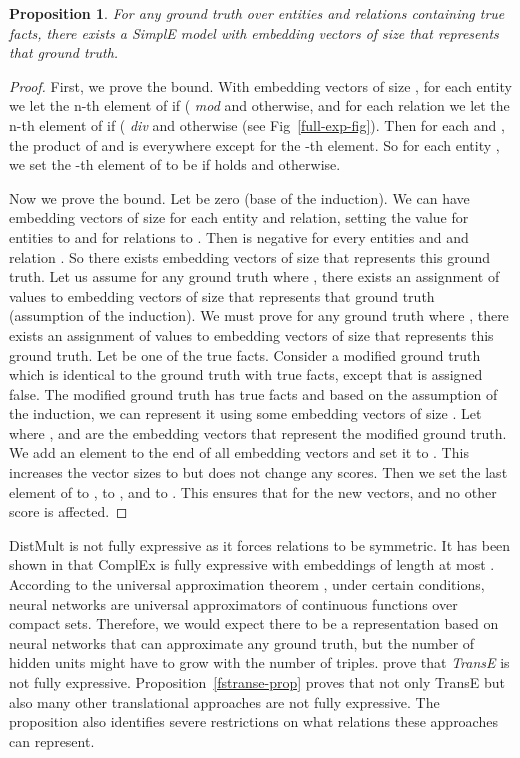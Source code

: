 \documentclass{article}
\newtheorem{proposition}{Proposition}
\begin{document}
\begin{proposition} \label{fully-expressiveness-prop}
For any ground truth over entities  and relations  containing  true facts, there exists a SimplE model with embedding vectors of size  that represents that ground truth.
\end{proposition}

\begin{proof}
First, we prove the  bound. With embedding vectors of size , for each entity  we let the n-th element of  if ( \emph{mod}  and  otherwise, and for each relation  we let the n-th element of  if ( \emph{div}  and  otherwise (see Fig~\ref{full-exp-fig}). Then for each  and , the product of  and  is  everywhere except for the -th element. So for each entity , we set the -th element of  to be  if  holds and  otherwise.

Now we prove the  bound. Let  be zero (base of the induction). We can have embedding vectors of size  for each entity and relation, setting the value for entities to  and for relations to . Then  is negative for every entities  and  and relation . So there exists embedding vectors of size  that represents this ground truth.
Let us assume for any ground truth where  , there exists an assignment of values to embedding vectors of size  that represents that ground truth (assumption of the induction). We must prove for any ground truth where , there exists an assignment of values to embedding vectors of size  that represents this ground truth.
Let  be one of the  true facts. Consider a modified ground truth which is identical to the ground truth with  true facts, except that  is assigned false. The modified ground truth has  true facts and based on the assumption of the induction, we can represent it using some embedding vectors of size . Let  where ,  and  are the embedding vectors that represent the modified ground truth. We add an element to the end of all embedding vectors and set it to . This increases the vector sizes to  but does not change any scores. Then we set the last element of  to ,  to , and  to . This ensures that  for the new vectors, and no other score is affected.
\end{proof}

DistMult is not fully expressive as it forces relations to be symmetric. It has been shown in \cite{trouillon2017knowledge} that ComplEx is fully expressive with embeddings of length at most . According to the universal approximation theorem \cite{cybenko1989approximations,hornik1991approximation}, under certain conditions, neural networks are universal approximators of continuous functions over compact sets. Therefore, we would expect there to be a representation based on neural networks that can approximate any ground truth, but the number of hidden units might have to grow with the number of triples. \citet{wang2017multi} prove that \emph{TransE} is not fully expressive. Proposition~\ref{fstranse-prop} proves that not only TransE but also many other translational approaches are not fully expressive. The proposition also identifies severe restrictions on what relations these approaches can represent. 
\end{document}
